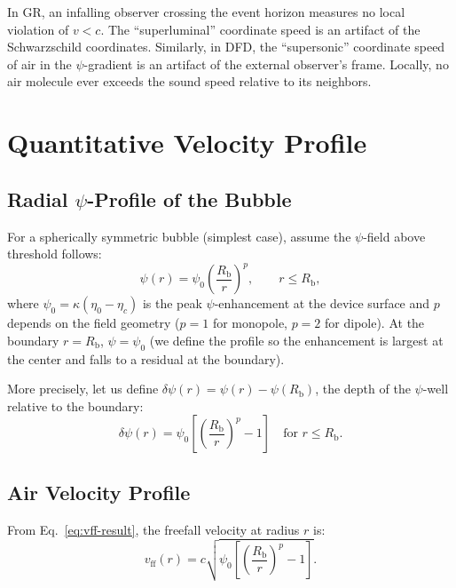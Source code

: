 \documentclass[12pt, letterpaper]{article}
\theoremstyle{definition}
\theoremstyle{remark}
\newcommand{\etac}{\eta_c}
\newcommand{\Rbub}{R_{\mathrm{b}}}
\newcommand{\deltapsi}{\delta\psi}
\begin{document}
In GR, an infalling observer crossing the event horizon measures no local
violation of $v < c$. The ``superluminal'' coordinate speed is an artifact of
the Schwarzschild coordinates. Similarly, in DFD, the ``supersonic'' coordinate
speed of air in the $\psi$-gradient is an artifact of the external observer's
frame. Locally, no air molecule ever exceeds the sound speed relative to its
neighbors.

\section{Quantitative Velocity Profile}
\label{sec:velocity-profile}

\subsection{Radial $\psi$-Profile of the Bubble}

For a spherically symmetric bubble (simplest case), assume the $\psi$-field
above threshold follows:
\begin{equation}
\psi(r) = \psi_0\left(\frac{\Rbub}{r}\right)^p, \qquad r \leq \Rbub,
\label{eq:psi-profile}
\end{equation}
where $\psi_0 = \kappa(\eta_0 - \etac)$ is the peak $\psi$-enhancement at the
device surface and $p$ depends on the field geometry ($p = 1$ for monopole,
$p = 2$ for dipole). At the boundary $r = \Rbub$, $\psi = \psi_0$ (we define
the profile so the enhancement is largest at the center and falls to a residual
at the boundary).

More precisely, let us define $\deltapsi(r) = \psi(r) - \psi(\Rbub)$, the
depth of the $\psi$-well relative to the boundary:
\begin{equation}
\deltapsi(r) = \psi_0\left[\left(\frac{\Rbub}{r}\right)^p - 1\right]
\quad \text{for } r \leq \Rbub.
\label{eq:deltapsi}
\end{equation}

\subsection{Air Velocity Profile}

From Eq.~\eqref{eq:vff-result}, the freefall velocity at radius $r$ is:
\begin{equation}
v_{\mathrm{ff}}(r) = c\sqrt{\psi_0\left[\left(\frac{\Rbub}{r}\right)^p - 1\right]}.
\label{eq:vff-profile}
\end{equation}
\end{document}
